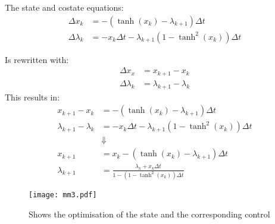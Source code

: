 The state and costate equations:
\begin{equation}
  \begin{split}
    \Delta x_k &= -\left( \tanh{(x_k)} - \lambda_{k + 1} \right)\Delta t \\
    \Delta\lambda_k &= - x_k \Delta t - \lambda_{k + 1} \left( 1 - \tanh^2{(x_k)} \right)\Delta t
  \end{split}
\end{equation}

Is rewritten with:
\begin{equation}
  \begin{split}
    \Delta x_x &= x_{k + 1} - x_k \\
    \Delta \lambda_{k} &= \lambda_{k + 1} - \lambda_{k}
  \end{split}
\end{equation}
This results in:
\begin{equation}
  \begin{split}
    x_{k + 1} - x_k &= -\left( \tanh{(x_k)} - \lambda_{k + 1} \right)\Delta t \\
    \lambda_{k + 1} - \lambda_{k} &= - x_k \Delta t - \lambda_{k + 1} \left( 1 - \tanh^2{(x_k)} \right)\Delta t \\
    &\Downarrow \\
    x_{k + 1} &= x_k - \left( \tanh{(x_k)} - \lambda_{k + 1} \right)\Delta t \\[1mm]
    \lambda_{k + 1} &= \frac{\lambda_k + x_k\Delta t}{1 - \left( 1 - \tanh^2{(x_k)} \right)\Delta t}
  \end{split}
\end{equation}

\begin{figure}[htbp]
  \centering
  \texttt{[image: mm3.pdf]} %
  \caption{Shows the optimisation of the state and the corresponding control}
  \label{fig:opti}
\end{figure}
